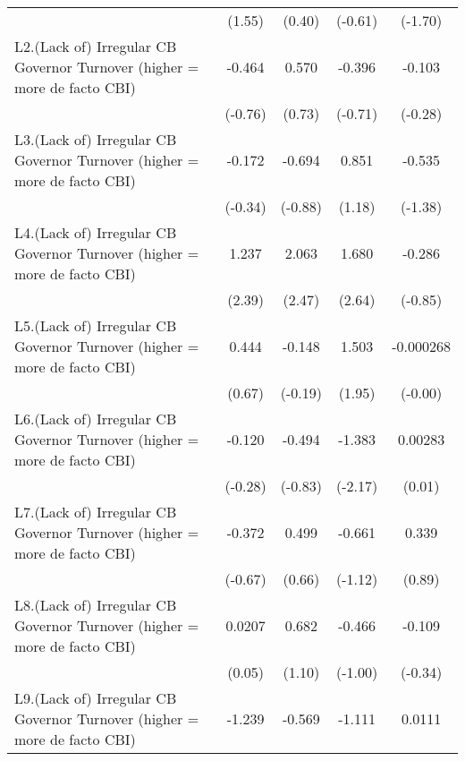 {\begin{longtable}{l*{4}{c}}
                &   (1.55)         &   (0.40)         &  (-0.61)         &  (-1.70)         \\
[1em]
L2.(Lack of) Irregular CB Governor Turnover (higher = more de facto CBI)&   -0.464         &    0.570         &   -0.396         &   -0.103         \\
                &  (-0.76)         &   (0.73)         &  (-0.71)         &  (-0.28)         \\
[1em]
L3.(Lack of) Irregular CB Governor Turnover (higher = more de facto CBI)&   -0.172         &   -0.694         &    0.851         &   -0.535         \\
                &  (-0.34)         &  (-0.88)         &   (1.18)         &  (-1.38)         \\
[1em]
L4.(Lack of) Irregular CB Governor Turnover (higher = more de facto CBI)&    1.237\sym{*}  &    2.063\sym{*}  &    1.680\sym{**} &   -0.286         \\
                &   (2.39)         &   (2.47)         &   (2.64)         &  (-0.85)         \\
[1em]
L5.(Lack of) Irregular CB Governor Turnover (higher = more de facto CBI)&    0.444         &   -0.148         &    1.503         &-0.000268         \\
                &   (0.67)         &  (-0.19)         &   (1.95)         &  (-0.00)         \\
[1em]
L6.(Lack of) Irregular CB Governor Turnover (higher = more de facto CBI)&   -0.120         &   -0.494         &   -1.383\sym{*}  &  0.00283         \\
                &  (-0.28)         &  (-0.83)         &  (-2.17)         &   (0.01)         \\
[1em]
L7.(Lack of) Irregular CB Governor Turnover (higher = more de facto CBI)&   -0.372         &    0.499         &   -0.661         &    0.339         \\
                &  (-0.67)         &   (0.66)         &  (-1.12)         &   (0.89)         \\
[1em]
L8.(Lack of) Irregular CB Governor Turnover (higher = more de facto CBI)&   0.0207         &    0.682         &   -0.466         &   -0.109         \\
                &   (0.05)         &   (1.10)         &  (-1.00)         &  (-0.34)         \\
[1em]
L9.(Lack of) Irregular CB Governor Turnover (higher = more de facto CBI)&   -1.239\sym{*}  &   -0.569         &   -1.111\sym{*}  &   0.0111         \\

\end{longtable}}
